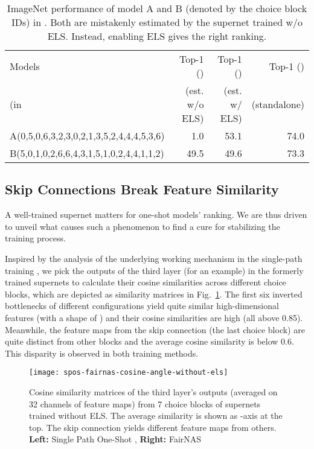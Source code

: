 \documentclass[runningheads]{llncs}
\begin{document}
\setlength{\tabcolsep}{4pt}
\begin{table}
	\caption{ImageNet performance of model A and B (denoted by the choice block IDs) in . Both are mistakenly estimated by the supernet trained w/o ELS. Instead, enabling ELS gives the right ranking.}
	\centering
	\begin{tabular} {|l*{3}{|r}|}\hline
		  Models   & Top-1 ()  & Top-1 () & Top-1 ()  \\
		 (in &(est. w/o ELS)&(est. w/ ELS)& (standalone)
		\\
		\hline
		A(0,5,0,6,3,2,3,0,2,1,3,5,2,4,4,4,5,3,6) & 1.0  & 53.1 & 74.0\\
		B(5,0,1,0,2,6,6,4,3,1,5,1,0,2,4,4,1,1,2)& 49.5&49.6 & 73.3 \\
		\hline
	\end{tabular}
	\label{fig:underest-overest}
\end{table}


\subsection{Skip Connections Break Feature Similarity}

A well-trained supernet matters for one-shot models' ranking. We are thus driven to unveil what causes such a phenomenon to find a cure for stabilizing the training process. 

Inspired by the analysis of the underlying working mechanism in the single-path training \cite{chu2019fairnas}, we pick the outputs of the third layer (for an example) in the formerly trained supernets to calculate their cosine similarities across different choice blocks, which are depicted as  similarity matrices in Fig.~\ref{fig:spos-fairnas-cosine-angle-3rd-no-els}.  The first six inverted bottlenecks of different configurations yield quite similar high-dimensional features (with a shape of ) and their cosine similarities are high (all above 0.85). Meanwhile, the feature maps from the skip connection (the last choice block) are quite distinct from other blocks and the average cosine similarity is below 0.6.  This disparity is observed in both training methods. 

\begin{figure}[ht]
\centering
\texttt{[image: spos-fairnas-cosine-angle-without-els]}
\caption{Cosine similarity matrices of the third layer's outputs (averaged on 32 channels of  feature maps) from 7 choice blocks of supernets trained without ELS. The average similarity is shown as -axis at the top. The skip connection yields different feature maps from others. \textbf{Left:} Single Path One-Shot \protect\cite{guo2019single}, \textbf{Right:} FairNAS \protect\cite{chu2019fairnas}}
\label{fig:spos-fairnas-cosine-angle-3rd-no-els}
\end{figure} 
\end{document}
